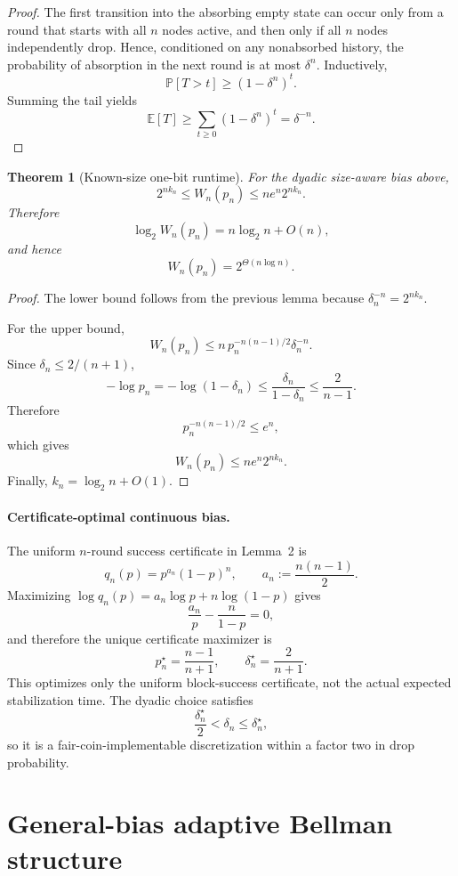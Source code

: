 \documentclass[11pt]{article}
\newtheorem{theorem}{Theorem}
\newcommand{\E}{\mathbb{E}}
\newcommand{\Prb}{\mathbb{P}}
\begin{document}
\begin{proof}
The first transition into the absorbing empty state can occur only from a
round that starts with all $n$ nodes active, and then only if all $n$ nodes
independently drop.  Hence, conditioned on any nonabsorbed history, the
probability of absorption in the next round is at most $\delta^n$.  Inductively,
\[
  \Prb[T>t]\ge {(1-\delta^n)}^t.
\]
Summing the tail yields
\[
  \E[T]\ge \sum_{t\ge0}{(1-\delta^n)}^t=\delta^{-n}.
\]
\end{proof}

\begin{theorem}[Known-size one-bit runtime]
For the dyadic size-aware bias above,
\[
  2^{n k_n}
  \le
  W_n(p_n)
  \le
  n e^n 2^{n k_n}.
\]
Therefore
\[
  \log_2 W_n(p_n)
  =
  n\log_2 n+O(n),
\]
and hence
\[
  W_n(p_n)=2^{\Theta(n\log n)}.
\]
\end{theorem}

\begin{proof}
The lower bound follows from the previous lemma because
$\delta_n^{-n}=2^{nk_n}$.

For the upper bound,
\[
  W_n(p_n)
  \le
  n\,p_n^{-n(n-1)/2}\delta_n^{-n}.
\]
Since $\delta_n\le2/(n+1)$,
\[
  -\log p_n
  =
  -\log(1-\delta_n)
  \le
  \frac{\delta_n}{1-\delta_n}
  \le
  \frac{2}{n-1}.
\]
Therefore
\[
  p_n^{-n(n-1)/2}\le e^n,
\]
which gives
\[
  W_n(p_n)\le n e^n 2^{nk_n}.
\]
Finally,
$k_n=\log_2 n+O(1)$.
\end{proof}


\paragraph{Certificate-optimal continuous bias.}
The uniform $n$-round success certificate in Lemma~2 is
\[
  q_n(p)=p^{a_n}{(1-p)}^n,
  \qquad a_n:=\frac{n(n-1)}2.
\]
Maximizing $\log q_n(p)=a_n\log p+n\log(1-p)$ gives
\[
  \frac{a_n}{p}-\frac{n}{1-p}=0,
\]
and therefore the unique certificate maximizer is
\[
  p_n^{\star}=\frac{n-1}{n+1},
  \qquad
  \delta_n^{\star}=\frac{2}{n+1}.
\]
This optimizes only the uniform block-success certificate, not the actual expected stabilization time.  The dyadic choice satisfies
\[
  \frac{\delta_n^{\star}}2 < \delta_n\le\delta_n^{\star},
\]
so it is a fair-coin-implementable discretization within a factor two in drop probability.

\section{General-bias adaptive Bellman structure}
\end{document}

